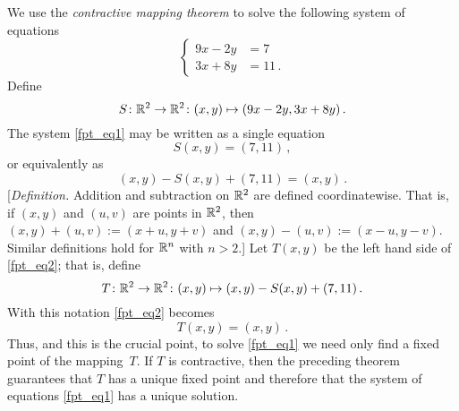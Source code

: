 \begin{exam}\label{fpt_exm1} We use the \emph{contractive mapping theorem} to solve the following
system of equations
  \begin{equation}\label{fpt_eq1}
                 \left\{   \begin{aligned}  9x - 2y  &=  7 \\
                                            3x + 8y  &=  11 \,.
                           \end{aligned}
                 \right.
  \end{equation}
Define
  \[ S \colon \mathbb{R}^2 \rightarrow \mathbb{R}^2 \colon (x,y) \mapsto (9x - 2y, 3x + 8y)\,. \]
The system \eqref{fpt_eq1} may be written as a single equation
  \[ S(x,y) = (7, 11)\,, \]
or equivalently as
  \begin{equation}\label{fpt_eq2}
                (x,y) - S(x,y) + (7, 11) = (x, y)\,.
  \end{equation}
[\emph{Definition.}  Addition and subtraction on $\mathbb{R}^2$ are defined coordinatewise.  That is, if
$(x,y)$ and $(u,v)$ are points in $\mathbb{R}^2$, then $(x,y) + (u,v) := (x + u,y + v)$ and $(x,y) - (u,v)
:= (x - u,y - v)$.  Similar definitions hold for $\mathbb{R}^n$ with $n > 2$.] Let $T(x,y)$ be the left
hand side of \eqref{fpt_eq2}; that is, define
  \[ T \colon \mathbb{R}^2 \rightarrow \mathbb{R}^2 \colon (x,y) \mapsto (x,y) - S(x,y) + (7,11)\,. \]
With this notation \eqref{fpt_eq2} becomes
  \[ T(x,y) = (x,y)\,. \]
Thus, and this is the crucial point, to solve \eqref{fpt_eq1} we need only find a fixed point of
the mapping~$T$.  If $T$ is contractive, then the preceding theorem guarantees that $T$ has a
unique fixed point and therefore that the system of equations \eqref{fpt_eq1} has a unique
solution.


\end{exam}
